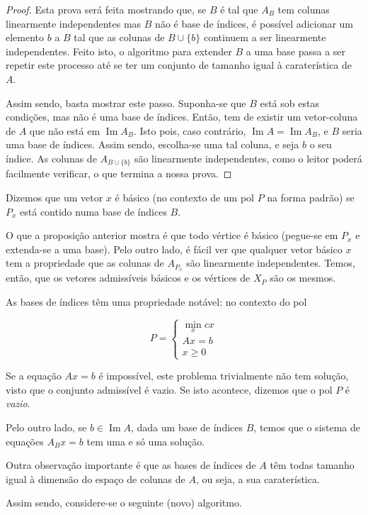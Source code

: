 \documentclass{article}
\DeclareMathOperator{\im}{Im}
\theoremstyle{definition}
\begin{document}
	\begin{proof}
	Esta prova será feita mostrando que, se $B$ é tal que $A_B$ tem colunas linearmente independentes mas $B$ não é base de índices, é possível adicionar um elemento $b$ a $B$ tal que as colunas de $B \cup \{b\}$ continuem a ser linearmente independentes. Feito isto, o algoritmo para extender $B$ a uma base passa a ser repetir este processo até se ter um conjunto de tamanho igual à caraterística de $A$.
	
	Assim sendo, basta mostrar este passo. Suponha-se que $B$ está sob estas condições, mas não é uma base de índices. Então, tem de existir um vetor-coluna de $A$ que não está em $\im A_B$. Isto pois, caso contrário, $\im A = \im A_B$, e $B$ seria uma base de índices. Assim sendo, escolha-se uma tal coluna, e seja $b$ o seu índice. As colunas de $A_{B \cup \{b\}}$ são linearmente independentes, como o leitor poderá facilmente verificar, o que termina a nossa prova.
	\end{proof}
	
	Dizemos que um vetor $x$ é básico (no contexto de um pol $P$ na forma padrão) se $P_x$ está contido numa base de índices $B$.
	
	O que a proposição anterior mostra é que todo vértice é básico (pegue-se em $P_x$ e extenda-se a uma base). Pelo outro lado, é fácil ver que qualquer vetor básico $x$ tem a propriedade que as colunas de $A_{P_x}$ são linearmente independentes. Temos, então, que os vetores admissíveis básicos e os vértices de $X_P$ são os mesmos.
	
	As bases de índices têm uma propriedade notável: no contexto do pol
	
	\[
	P =
	\begin{cases}
	\min\limits_x cx\\
	Ax = b\\
	x \geq 0
	\end{cases}
	\]
	
	Se a equação $Ax = b$ é impossível, este problema trivialmente não tem solução, visto que o conjunto admissível é vazio. Se isto acontece, dizemos que o pol $P$ é \emph{vazio}.
	
	Pelo outro lado, se $b \in \im A$, dada um base de índices $B$, temos que o sistema de equações $A_B x = b$ tem uma e só uma solução.
	
	Outra observação importante é que as bases de índices de $A$ têm todas tamanho igual à dimensão do espaço de colunas de $A$, ou seja, a sua caraterística.
	
	Assim sendo, considere-se o seguinte (novo) algoritmo.
	
\end{document}
